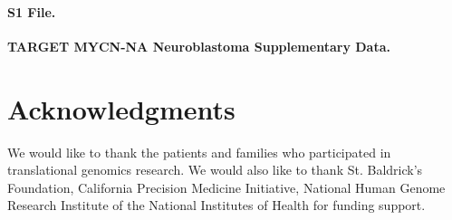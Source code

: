 \documentclass[10pt,letterpaper]{article}
\begin{document}
\paragraph*{S1 File.}
\label{S1_File}
{\bf TARGET MYCN-NA Neuroblastoma Supplementary Data.}




\section*{Acknowledgments}
We would like to thank the patients and families who participated in translational genomics research. We would also like to thank St. Baldrick's Foundation, California Precision Medicine Initiative, National Human Genome Research Institute of the National Institutes of Health for funding support.

\nolinenumbers

%
%
% 
\end{document}
